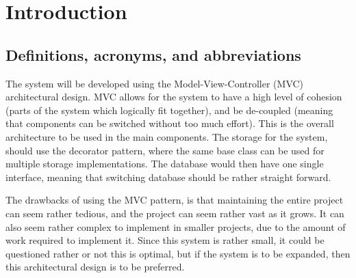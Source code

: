 \documentclass[10pt]{report}
\numberwithin{equation}{section} %
\numberwithin{figure}{section} %
\numberwithin{table}{section} %
\begin{document}
\clearpage
\section{Introduction}
\subsection{Definitions, acronyms, and abbreviations}
The system will be developed using the Model-View-Controller (MVC) architectural
design. MVC allows for the system to have a high level of cohesion (parts of the
system which logically fit together), and be de-coupled (meaning that components
can be switched without too much effort). This is the overall architecture to be
used in the main components. The storage for the system, should use the
decorator pattern, where the same base class can be used for multiple storage
implementations. The database would then have one single interface, meaning that
switching database should be rather straight forward.

The drawbacks of using the MVC pattern, is that maintaining the entire project
can seem rather tedious, and the project can seem rather vast as it grows. It
can also seem rather complex to implement in smaller projects, due to the amount
of work required to implement it. Since this system is rather small, it could be
questioned rather or not this is optimal, but if the system is to be expanded,
then this architectural design is to be preferred.
%
\end{document}
